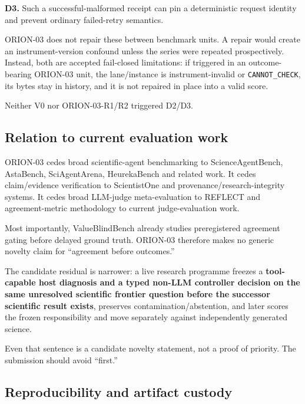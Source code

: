 \documentclass[10pt]{article}
\begin{document}
\textbf{D3.} Such a successful-malformed receipt can pin a deterministic
request identity and prevent ordinary failed-retry semantics.

ORION-03 does not repair these between benchmark units. A repair would
create an instrument-version confound unless the series were repeated
prospectively. Instead, both are accepted fail-closed limitations: if
triggered in an outcome-bearing ORION-03 unit, the lane/instance is
instrument-invalid or \texttt{CANNOT\_CHECK}, its bytes stay in history,
and it is not repaired in place into a valid score.

Neither V0 nor ORION-03-R1/R2 triggered D2/D3.

\hypertarget{relation-to-current-evaluation-work}{%
\subsection{Relation to current evaluation
work}\label{relation-to-current-evaluation-work}}

ORION-03 cedes broad scientific-agent benchmarking to ScienceAgentBench,
AstaBench, SciAgentArena, HeurekaBench and related work. It cedes
claim/evidence verification to ScientistOne and
provenance/research-integrity systems. It cedes broad LLM-judge
meta-evaluation to REFLECT and agreement-metric methodology to current
judge-evaluation work.

Most importantly, ValueBlindBench already studies preregistered
agreement gating before delayed ground truth. ORION-03 therefore makes
no generic novelty claim for ``agreement before outcomes.''

The candidate residual is narrower: a live research programme freezes a
\textbf{tool-capable host diagnosis and a typed non-LLM controller
decision on the same unresolved scientific frontier question before the
successor scientific result exists}, preserves contamination/abstention,
and later scores the frozen responsibility and move separately against
independently generated science.

Even that sentence is a candidate novelty statement, not a proof of
priority. The submission should avoid ``first.''

\hypertarget{reproducibility-and-artifact-custody}{%
\subsection{Reproducibility and artifact
custody}\label{reproducibility-and-artifact-custody}}
\end{document}
